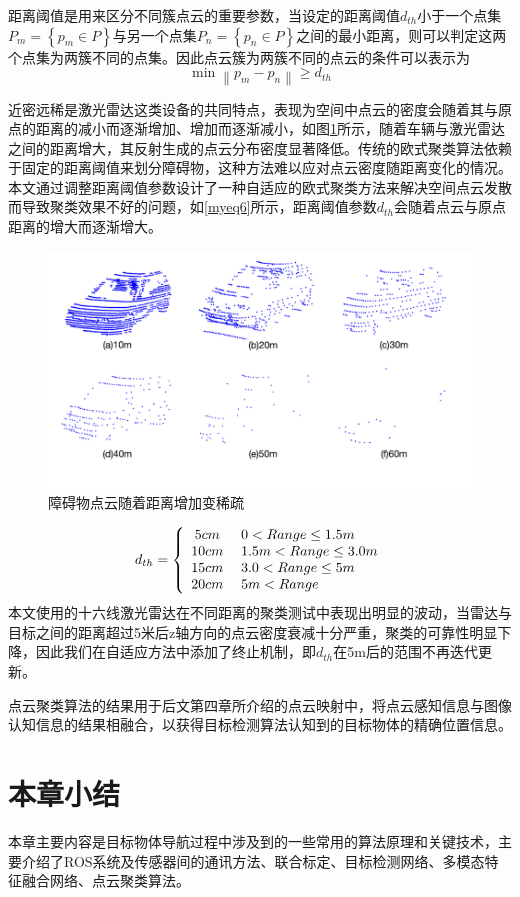 距离阈值是用来区分不同簇点云的重要参数，当设定的距离阈值${d_{th}}$小于一个点集${P_m} = \left\{ {{p_m} \in P} \right\}$与另一个点集${P_n} = \left\{ {{p_n} \in P} \right\}$之间的最小距离，则可以判定这两个点集为两簇不同的点集。因此点云簇为两簇不同的点云的条件可以表示为
\begin{equation}
    \min \left\| {{p_m} - {p_n}} \right\| \ge {d_{th}}
    \label{myeq5}
\end{equation}

近密远稀是激光雷达这类设备的共同特点，表现为空间中点云的密度会随着其与原点的距离的减小而逐渐增加、增加而逐渐减小，如图\ref{fcarpoints}所示，随着车辆与激光雷达之间的距离增大，其反射生成的点云分布密度显著降低。传统的欧式聚类算法依赖于固定的距离阈值来划分障碍物，这种方法难以应对点云密度随距离变化的情况。本文通过调整距离阈值参数设计了一种自适应的欧式聚类方法来解决空间点云发散而导致聚类效果不好的问题，如\eqref{myeq6}所示，距离阈值参数$d_{th}$会随着点云与原点距离的增大而逐渐增大。

\begin{figure}[htbp]
    \centering
    \includegraphics[scale=0.75]{Fig/carpoints.png}
    \caption{\label{fcarpoints}障碍物点云随着距离增加变稀疏}
\end{figure}
\begin{equation}
    {d_{th}} = \left\{ {\begin{array}{*{20}{c}}
{5cm}\\
{10cm}\\
{15cm}\\
{20cm}
\end{array}} \right.{\rm{ }}\begin{array}{*{20}{l}}
{0 < Range \le 1.5m}\\
{1.5m < Range \le 3.0m}\\
{3.0 < Range \le 5m}\\
{5m < Range}
\end{array}
    \label{myeq6}
\end{equation}
本文使用的十六线激光雷达在不同距离的聚类测试中表现出明显的波动，当雷达与目标之间的距离超过5米后z轴方向的点云密度衰减十分严重，聚类的可靠性明显下降，因此我们在自适应方法中添加了终止机制，即$d_{th}$在5m后的范围不再迭代更新。

点云聚类算法的结果用于后文第四章所介绍的点云映射中，将点云感知信息与图像认知信息的结果相融合，以获得目标检测算法认知到的目标物体的精确位置信息。


\section{本章小结}
本章主要内容是目标物体导航过程中涉及到的一些常用的算法原理和关键技术，主要介绍了ROS系统及传感器间的通讯方法、联合标定、目标检测网络、多模态特征融合网络、点云聚类算法。

